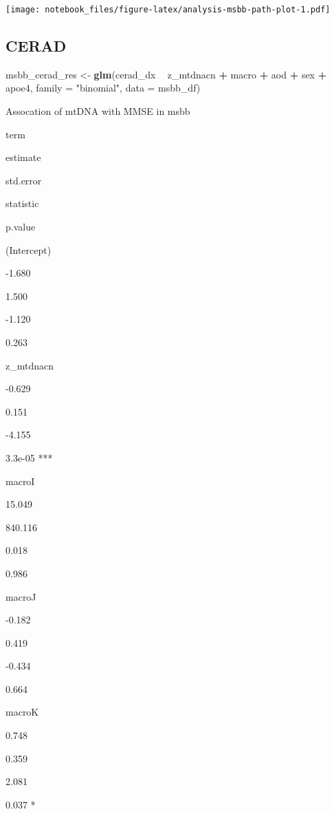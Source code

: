 \documentclass[]{book}
\newenvironment{Shaded}{\begin{snugshade}}{\end{snugshade}}
\newcommand{\DataTypeTok}[1]{\textcolor[rgb]{0.13,0.29,0.53}{#1}}
\newcommand{\KeywordTok}[1]{\textcolor[rgb]{0.13,0.29,0.53}{\textbf{#1}}}
\newcommand{\NormalTok}[1]{#1}
\newcommand{\OperatorTok}[1]{\textcolor[rgb]{0.81,0.36,0.00}{\textbf{#1}}}
\newcommand{\StringTok}[1]{\textcolor[rgb]{0.31,0.60,0.02}{#1}}
\begin{document}
\texttt{[image: notebook\_files/figure-latex/analysis-msbb-path-plot-1.pdf]}

\hypertarget{cerad}{%
\subsection{CERAD}\label{cerad}}

\begin{Shaded}
\begin{Highlighting}[]
\NormalTok{msbb_cerad_res <-}\StringTok{ }\KeywordTok{glm}\NormalTok{(cerad_dx }\OperatorTok{~}\StringTok{ }\NormalTok{z_mtdnacn }\OperatorTok{+}\StringTok{ }\NormalTok{macro }\OperatorTok{+}\StringTok{ }\NormalTok{aod }\OperatorTok{+}\StringTok{ }\NormalTok{sex }\OperatorTok{+}\StringTok{ }\NormalTok{apoe4, }
                       \DataTypeTok{family =} \StringTok{"binomial"}\NormalTok{, }\DataTypeTok{data =}\NormalTok{ msbb_df)}
\end{Highlighting}
\end{Shaded}

\label{tab:analysis-msbb-cerad-tab}Assocation of mtDNA with MMSE in msbb

term

estimate

std.error

statistic

p.value

(Intercept)

-1.680

1.500

-1.120

0.263

z\_mtdnacn

-0.629

0.151

-4.155

3.3e-05 ***

macroI

15.049

840.116

0.018

0.986

macroJ

-0.182

0.419

-0.434

0.664

macroK

0.748

0.359

2.081

0.037 *
\end{document}
